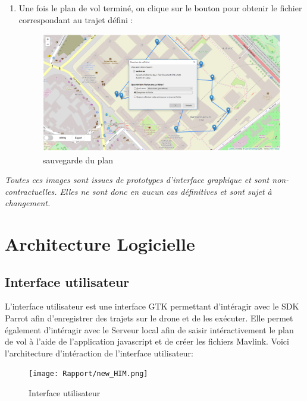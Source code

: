 \documentclass{article}
\begin{document}
\begin{enumerate}
  	\item Une fois le plan de vol terminé, on clique sur le bouton pour obtenir le fichier correspondant au trajet défini :\\
  	\begin{figure}[!h]
 	\begin{center}
 	\includegraphics[scale=0.42]{capt8.PNG}
 	\caption{sauvegarde du plan}
 	\end{center}
 	\end{figure}
 	\end{enumerate}
	\textit{Toutes ces images sont issues de prototypes d'interface graphique et sont non-contractuelles. Elles ne sont donc en aucun cas définitives et sont sujet à changement.}
	
    
        
	\newpage
\section{Architecture Logicielle}
    \subsection{Interface utilisateur}
    L'interface utilisateur est une interface GTK permettant d'intéragir avec le SDK Parrot afin d'enregistrer des trajets sur le drone et de les exécuter.
    \newline
    Elle permet également d'intéragir avec le Serveur local afin de saisir intéractivement le plan de vol à l'aide de l'application javascript et de créer les fichiers Mavlink.
    \vspace{0.2cm}
    \newline
    Voici l'architecture d'intéraction de l'interface utilisateur:
        \vspace*{0.5cm}
        \begin{center}
		\begin{figure}[!h]
		\texttt{[image: Rapport/new\_HIM.png]}\\
		 \vspace*{0.3cm}
		\caption{Interface utilisateur}
		\end{figure}
        \end{center}
\end{document}

